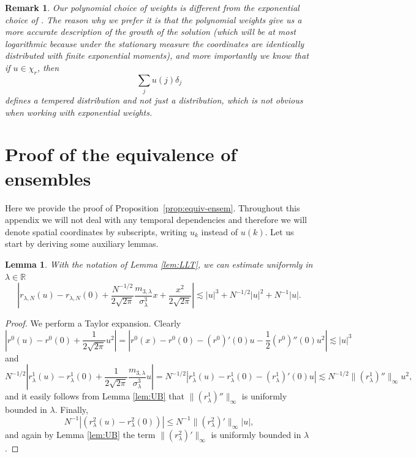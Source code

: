 \documentclass[11pt, a4paper]{article}
\newtheorem{lemma}[theorem]{Lemma}
\newtheorem{remark}[theorem]{Remark}
\newcommand{\1}{\mathbf{1}}
\begin{document}
\begin{remark}
  Our polynomial choice of weights is different from the exponential choice of
  \cite{bib:funakiSpohn, bib:giacominOllaSpohn}. The reason why
  we prefer it is that the polynomial weights give us a more accurate
  description of the growth of the solution (which will be at most
  logarithmic because under the stationary measure the coordinates are
  identically distributed with finite exponential moments), and more importantly we know
  that if $u \in \chi_r$, then
  \[ \sum_j u (j) \delta_j \]
  defines a tempered distribution and not just a distribution, which is not
  obvious when working with exponential weights.
\end{remark}

\section{Proof of the equivalence of ensembles}\label{app:equiv-ensem-proof}

Here we provide the proof of Proposition~\ref{prop:equiv-ensem}. Throughout this appendix we will not deal
with any temporal dependencies and therefore we will denote spatial
coordinates by subscripts, writing $u_k$ instead of $u (k)$. Let us start by deriving some auxiliary lemmas.

\begin{lemma}\label{lem:Gaussian expansion}
  With the notation of Lemma \ref{lem:LLT}, we can estimate uniformly in $\lambda \in
  \mathbb{R}$
  \[ \left| r_{\lambda, N} (u) - r_{\lambda, N} (0) + \frac{N^{- 1 / 2}}{2
     \sqrt{2 \pi}} \frac{m_{3, \lambda}}{\sigma^3_{\lambda}} x + \frac{x^2}{2
     \sqrt{2 \pi}} \right| \lesssim | u |^3 + N^{- 1 / 2} | u |^2 + N^{- 1} |
     u | . \]
\end{lemma}

\begin{proof}
  We perform a Taylor expansion. Clearly
  \[
      \left| r^0 (u) - r^0 (0) + \frac{1}{2 \sqrt{2 \pi}} u^2 \right| = \left| r^0 (x) - r^0 (0) - (r^0)' (0) u - \frac{1}{2} (r^0)'' (0) u^2
     \right| 
     \lesssim | u |^3 \]
  and
  \[
     N^{- 1 / 2} \left| r^1_{\lambda} (u) - r^1_{\lambda} (0) +
     \frac{1}{2 \sqrt{2 \pi}} \frac{m_{3, \lambda}}{\sigma^3_{\lambda}} u
     \right| = N^{- 1 / 2} | r^1_{\lambda} (u) - r^1_{\lambda} (0) - (r^1_{\lambda})'
     (0) u |  \lesssim N^{- 1 / 2} \| (r^1_{\lambda})'' \|_{\infty} u^2, \]
     and it easily follows from Lemma \ref{lem:UB} that $\|
  (r^1_{\lambda})'' \|_{\infty}$ is uniformly bounded in $\lambda$. Finally,
  \[ N^{- 1} | (r^2_{\lambda} (u) - r^2_{\lambda} (0)) | \leqslant N^{- 1} \|
     (r^2_{\lambda})' \|_{\infty} | u |, \]
     and again by Lemma \ref{lem:UB} the term $\|
  (r^2_{\lambda})' \|_{\infty}$ is uniformly bounded in $\lambda$.
\end{proof}
\end{document}
